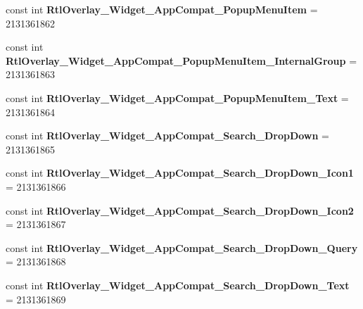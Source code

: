 \begin{DoxyCompactItemize}
const int {\bfseries Rtl\+Overlay\+\_\+\+Widget\+\_\+\+App\+Compat\+\_\+\+Popup\+Menu\+Item} = 2131361862
\item 
\mbox{\label{class_sample_app_1_1_droid_1_1_resource_1_1_style_a498259ce9e28994b689c9c0c7d1a3d22}} 
const int {\bfseries Rtl\+Overlay\+\_\+\+Widget\+\_\+\+App\+Compat\+\_\+\+Popup\+Menu\+Item\+\_\+\+Internal\+Group} = 2131361863
\item 
\mbox{\label{class_sample_app_1_1_droid_1_1_resource_1_1_style_acebdd8d7f967323e1e5585d79be5b58b}} 
const int {\bfseries Rtl\+Overlay\+\_\+\+Widget\+\_\+\+App\+Compat\+\_\+\+Popup\+Menu\+Item\+\_\+\+Text} = 2131361864
\item 
\mbox{\label{class_sample_app_1_1_droid_1_1_resource_1_1_style_aaaae7d8bb25456ba387c9a2aab2ce103}} 
const int {\bfseries Rtl\+Overlay\+\_\+\+Widget\+\_\+\+App\+Compat\+\_\+\+Search\+\_\+\+Drop\+Down} = 2131361865
\item 
\mbox{\label{class_sample_app_1_1_droid_1_1_resource_1_1_style_ab9fbd68bc850e24917732d3624a3a233}} 
const int {\bfseries Rtl\+Overlay\+\_\+\+Widget\+\_\+\+App\+Compat\+\_\+\+Search\+\_\+\+Drop\+Down\+\_\+\+Icon1} = 2131361866
\item 
\mbox{\label{class_sample_app_1_1_droid_1_1_resource_1_1_style_ab2803faf55fc325b3658423824568048}} 
const int {\bfseries Rtl\+Overlay\+\_\+\+Widget\+\_\+\+App\+Compat\+\_\+\+Search\+\_\+\+Drop\+Down\+\_\+\+Icon2} = 2131361867
\item 
\mbox{\label{class_sample_app_1_1_droid_1_1_resource_1_1_style_a2273971ab2cb83a5b3573654357fe1d0}} 
const int {\bfseries Rtl\+Overlay\+\_\+\+Widget\+\_\+\+App\+Compat\+\_\+\+Search\+\_\+\+Drop\+Down\+\_\+\+Query} = 2131361868
\item 
\mbox{\label{class_sample_app_1_1_droid_1_1_resource_1_1_style_a5c61eab2e51147c3459f12ace6a207be}} 
const int {\bfseries Rtl\+Overlay\+\_\+\+Widget\+\_\+\+App\+Compat\+\_\+\+Search\+\_\+\+Drop\+Down\+\_\+\+Text} = 2131361869

\end{DoxyCompactItemize}
